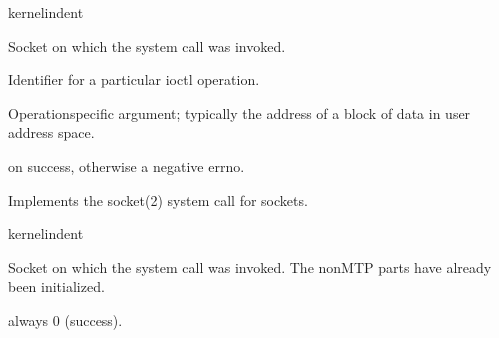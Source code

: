 \documentclass[letterpaper,10pt,english]{sphinxmanual}
\begin{document}
\begin{sphinxuseclass}{kernelindent}
\sphinxAtStartPar
{}
\begin{description}
\sphinxAtStartPar
Socket on which the system call was invoked.

\sphinxAtStartPar
Identifier for a particular ioctl operation.

\sphinxAtStartPar
Operation\sphinxhyphen{}specific argument; typically the address of a block
of data in user address space.

\end{description}

\sphinxAtStartPar
{}

 on success, otherwise a negative errno.

\end{sphinxuseclass}

\begin{fulllineitems}
\label{\detokenize{mtpimpl.c:c.MTP_socket}}
\pysigstartsignatures
\pysigstartmultiline
{}
\pysigstopmultiline
\pysigstopsignatures
\sphinxAtStartPar
Implements the socket(2) system call for sockets.

\end{fulllineitems}


\begin{sphinxuseclass}{kernelindent}
\sphinxAtStartPar
{}
\begin{description}
\sphinxAtStartPar
Socket on which the system call was invoked. The non\sphinxhyphen{}MTP
parts have already been initialized.

\end{description}

\sphinxAtStartPar
{}

\sphinxAtStartPar
always 0 (success).

\end{sphinxuseclass}
\end{document}
